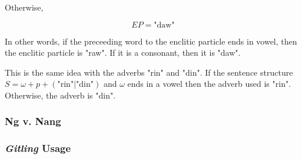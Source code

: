 Otherwise,

\[
    EP = \text{"daw"}
\]

In other words, if the preceeding word to the enclitic particle ends in vowel,
then the enclitic particle is "raw". If it is a consonant, then it is "daw".

This is the same idea with the adverbs "rin" and "din". If the sentence structure
\(S = \omega + p + (\text{"rin"}|\text{"din"})\) and \(\omega\) ends in a vowel
then the adverb used is "rin". Otherwise, the adverb is "din".

\subsubsection{Ng v. Nang}

\subsubsection{\textit{Gitling} Usage}